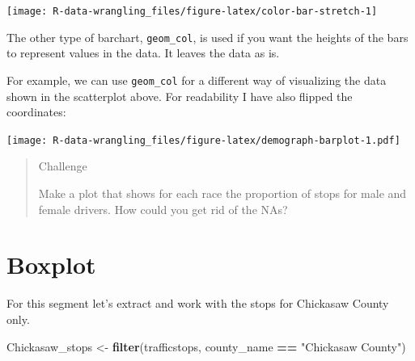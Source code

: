 \documentclass[]{book}
\newenvironment{Shaded}{\begin{snugshade}}{\end{snugshade}}
\newcommand{\KeywordTok}[1]{\textcolor[rgb]{0.13,0.29,0.53}{\textbf{#1}}}
\newcommand{\DataTypeTok}[1]{\textcolor[rgb]{0.13,0.29,0.53}{#1}}
\newcommand{\FloatTok}[1]{\textcolor[rgb]{0.00,0.00,0.81}{#1}}
\newcommand{\StringTok}[1]{\textcolor[rgb]{0.31,0.60,0.02}{#1}}
\newcommand{\OperatorTok}[1]{\textcolor[rgb]{0.81,0.36,0.00}{\textbf{#1}}}
\newcommand{\NormalTok}[1]{#1}
\theoremstyle{definition}
\theoremstyle{definition}
\theoremstyle{definition}
\theoremstyle{remark}
\begin{document}
\texttt{[image: R-data-wrangling\_files/figure-latex/color-bar-stretch-1]}

The other type of barchart, \texttt{geom\_col}, is used if you want the
heights of the bars to represent values in the data. It leaves the data
as is.

For example, we can use \texttt{geom\_col} for a different way of
visualizing the data shown in the scatterplot above. For readability I
have also flipped the coordinates:

\begin{Shaded}
\end{Shaded}

\texttt{[image: R-data-wrangling\_files/figure-latex/demograph-barplot-1.pdf]}

\begin{quote}
Challenge

Make a plot that shows for each race the proportion of stops for male
and female drivers. How could you get rid of the NAs?
\end{quote}

\section{Boxplot}\label{boxplot}

For this segment let's extract and work with the stops for Chickasaw
County only.

\begin{Shaded}
\begin{Highlighting}[]
\NormalTok{Chickasaw_stops <-}\StringTok{ }\KeywordTok{filter}\NormalTok{(trafficstops, county_name }\OperatorTok{==}\StringTok{ "Chickasaw County"}\NormalTok{)}
\end{Highlighting}
\end{Shaded}
\end{document}
